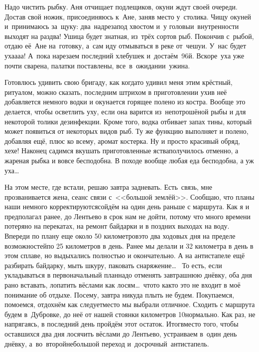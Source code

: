 Надо чистить рыбку. Аня отчищает подлещиков, окуни ждут своей очереди. Достав свой ножик, присоединяюсь к~Ане, заняв место у~столика. Чищу окуней и~принимаюсь за~щуку: два~надреза\mdash под хвостом и~у головы\mdash и~внутренности выходят на раз\sdash два! Ушица будет знатная, из~трёх сортов рыб. Покончив с~рыбой, отдаю её~Ане на~готовку, а~сам иду отмываться в реке от~чешуи. У~нас будет уха\sdash а\sdash а\sdash а! А~пока нарезаем последний хлебушек и~достаём~96\sdash й. Вскоре~уха уже почти сварена, палатки поставлены, все~в~ожидании~ужина. 

Готовлюсь удивить свою бригаду, как когда\sdash то удивил меня этим крёстный, ритуалом, можно сказать, последним штрихом в приготовлении ухи\mdash в неё добавляется немного водки и окунается горящее полено из костра. Вообще это делается, чтобы осветлить уху, если она варится из~непотрошёной рыбы и для некоторой толики дезинфекции. Кроме того, водка отбивает запах тины, который может появиться от некоторых видов рыб. Ту же функцию выполняет и полено, добавляя ещё, плюс ко всему, аромат костерка. Ну и просто красивый обряд, хе\sdash хе! Наконец садимся вкушать приготовленные яства\mdash получилось отменно, а жареная рыбка и вовсе бесподобна. В походе вообще любая еда бесподобна, а уж уха\ldots~

На этом месте, где встали, решаю завтра задневать. Есть~связь, мне прозванивается жена, сеанс связи с~<<большой землёй>>. Сообщаю, что планы наши немного корректируются\mdash сойдём на один день раньше с маршрута. Как я и предполагал ранее, до Лентьево в срок нам не дойти, потому что много времени потеряно на перекатах, на ремонт байдарки и в поздних выходах на воду. Впереди по плану еще около 50 километров\mdash это два ходовых дня на пределе возможностей\mdash по 25 километров в день. Ранее мы делали и 32 километра в день в этом сплаве, но выдыхались полностью и окончательно. А на антистапеле ещё разбирать байдарку, мыть шкуру, паковать снаряжение\ldots~
\newpage
То есть, если укладываться в первоначальный план\mdash надо отменять завтрашнюю днёвку, оба дня рано вставать, лопатить вёслами как лосям\ldots~что\sdash то как\sdash то это не входит в моё понимание об отдыхе. Посему, завтра никуда плыть не будем. Покупаемся, помоемся, отдохнём как следует\mdash место мы выбрали отличное. Сходить с маршрута будем в~Дубровке, до неё от нашей стоянки километров 10\mdash нормально. Как раз, не напрягаясь, в последний день пройдём этот остаток. Итог\mdash вместо того, чтобы оставшихся два дня лосячить вёслами до Лентьево, устраиваем в~один день днёвку, а~во~второй\mdash небольшой переход и~досрочный~антистапель. 

